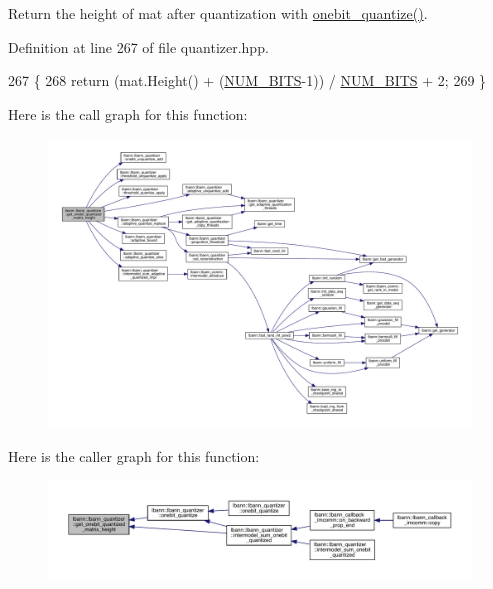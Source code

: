 Return the height of mat after quantization with \hyperlink{classlbann_1_1lbann__quantizer_a4dd4696cbbfd93c73e5fb3c40fcb16c3}{onebit\+\_\+quantize()}. 

Definition at line 267 of file quantizer.\+hpp.


\begin{DoxyCode}
267                                                                         \{
268     \textcolor{keywordflow}{return} (mat.Height() + (\hyperlink{classlbann_1_1lbann__quantizer_a33ea17392f53b90e91aea1ffb7e11d68}{NUM\_BITS}-1)) / \hyperlink{classlbann_1_1lbann__quantizer_a33ea17392f53b90e91aea1ffb7e11d68}{NUM\_BITS} + 2;
269   \}
\end{DoxyCode}
Here is the call graph for this function\+:\nopagebreak
\begin{figure}[H]
\begin{center}
\leavevmode
\includegraphics[width=350pt]{classlbann_1_1lbann__quantizer_aa1541b9afa60250dbd570acbbe98242f_cgraph}
\end{center}
\end{figure}
Here is the caller graph for this function\+:\nopagebreak
\begin{figure}[H]
\begin{center}
\leavevmode
\includegraphics[width=350pt]{classlbann_1_1lbann__quantizer_aa1541b9afa60250dbd570acbbe98242f_icgraph}
\end{center}
\end{figure}
\mbox{\label{classlbann_1_1lbann__quantizer_a71023cbf93b54d8e8707d137e3c6007a}} 
